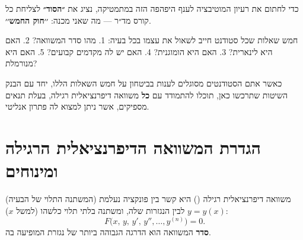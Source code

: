 \documentclass{article}
\numberwithin{equation}{section}
\begin{document}
\begin{comment}
נדגיש כי ארגז הכלים שתרכשו כאן, כמו גם הכלים שתפגשו בכל קורס למשוואות דיפרנציאליות רגילות,  
מוגבל ביכולתו לפתור בעיות ריאליסטיות ומתקדמות יותר — אך בו־בזמן עוצמתי בצורה בלתי רגילה.  
עם ההבנה הפיזיקלית הנכונה של הבעיה, תראו כי ברוב המקרים המודל המתמטי יתואר לפחות באמצעות משוואה דיפרנציאלית \textbf{חלקית},  
אשר טכניקות הפתרון שלה חורגות מעבר להיקף ספר זה.  
אולם בעזרת הנחות מדויקות ותפיסה עמוקה של טבע הבעיה, נוכל לצמצם אותה — במקרה ה״פחות טוב״ —  
למשוואה דיפרנציאלית רגילה אשר מצריכה פתרון נומרי, ובמקרה ה״טוב״ יותר —  
לפתרון אנליטי סגור, באמצעות הכלים שרכשנו כאן.

כדי לחתום את רעיון המוטיבציה לענף היפהפה הזה במתמטיקה,  
נציג את \textbf{``סיסמת הזהב''} לצליחת כל קורס מד״ר — מה שאני מכנה: \textbf{``דרך המלך''}.  

חמישה צעדים שכל סטודנט חייב לשאול בכל בעיה:  
1. מהו סדר המשוואה?  
2. האם היא לינארית?  
3. האם היא הומוגנית?  
4. האם יש לה מקדמים קבועים?  
5. האם היא מנורמלת?  

כאשר סטודנט מסוגל לענות בביטחון על חמש השאלות הללו — הוא \textbf{על דרך המלך}.  
בנק השיטות שתלמדו כאן יאפשר לכם להתמודד עם כל משוואה דיפרנציאלית רגילה,  
בעלת תנאים מספיקים, אשר ניתן למצוא לה פתרון אנליטי.
\end{comment}

\begin{goldenbox}
כדי לחתום את רעיון המוטיבציה לענף היפהפה הזה במתמטיקה,  
נציג את \textbf{״הסוד״} לצליחת כל קורס מד״ר — מה שאני מכנה: \textbf{׳׳חוק החמש׳׳}.  

חמש שאלות שכל סטודנט חייב לשאול את עצמו בכל בעיה:  
1. מהו סדר המשוואה?  
2. האם היא לינארית?  
3. האם היא הומוגנית?  
4. האם יש לה מקדמים קבועים?  
5. האם היא מנורמלת?  

כאשר אתם הסטודנטים מסוגלים לענות בביטחון על חמש השאלות הללו,  
יחד עם הבנק השיטות שתרכשו כאן, תוכלו להתמודד עם \textbf{כל} משוואה דיפרנציאלית רגילה,  
בעלת תנאים מספיקים, אשר ניתן למצוא לה פתרון אנליטי.
\end{goldenbox}


\newpage

\section{הגדרת המשוואה הדיפרנציאלית הרגילה ומינוחים}\label{sec:what-is-ode}
משוואה דיפרנציאלית רגילה () היא קשר בין פונקציה נעלמת (המשתנה התלוי של הבעיה) $y=y(x)$ לבין הנגזרות שלה, ומשתנה בלתי תלוי כלשהו (למשל $x$):
\begin{equation}
F\big(x,\,y,\,y',\,y'',\ldots, y^{(n)}\big)=0.
\end{equation}
\textbf{סדר} המשוואה הוא הדרגה הגבוהה ביותר של נגזרת המופיעה בה.
\end{document}
